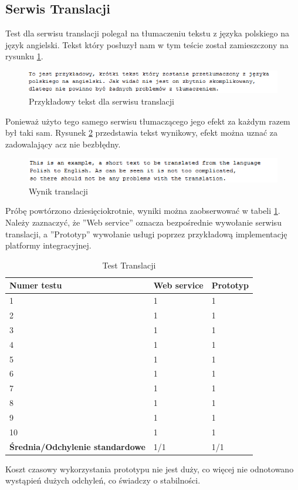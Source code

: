 \subsection{Serwis Translacji}
Test dla serwisu translacji polegał na tłumaczeniu tekstu z języka polskiego na język angielski. Tekst który posłuzył nam w tym teście został zamieszczony na rysunku \ref{fig:translatorExample}.
\begin{figure}[!h]
\centering
\includegraphics[scale=0.9]{translatorExample.png}
\caption{Przykładowy tekst dla serwisu translacji}\label{fig:translatorExample}
\end{figure}
Ponieważ użyto tego samego serwisu tłumaczącego jego efekt za każdym razem był taki sam. Rysunek \ref{fig:translatorResult} przedstawia tekst wynikowy, efekt można uznać za zadowalający acz nie bezbłędny. 
\begin{figure}[!h]
\centering
\includegraphics[scale=0.9]{translatorResult.png}
\caption{Wynik translacji}\label{fig:translatorResult}
\end{figure}

Próbę powtórzono dziesięciokrotnie, wyniki można zaobserwować w tabeli \ref{tab:translacja}. Należy zaznaczyć, że ''Web service'' oznacza bezpośrednie wywołanie serwisu translacji, a ''Prototyp'' wywołanie usługi poprzez przykładową implementację platformy integracyjnej.
\begin{center}
	\begin{table}[h]
	\label{tab:translacja}
	\caption{Test Translacji}
	\centering
	\begin{tabular}{| l | l | l |}	
		\hline
		\textbf{Numer testu} & \textbf{Web service} & \textbf{Prototyp} \\ \hline
		1 & 1 & 1\\ \hline
		2 & 1 & 1\\ \hline
		3 & 1 & 1\\ \hline
		4 & 1 & 1\\ \hline
		5 & 1 & 1\\ \hline
		6 & 1 & 1\\ \hline
		7 & 1 & 1\\ \hline
		8 & 1 & 1\\ \hline
		9 & 1 & 1\\ \hline
		10 & 1 & 1\\ \hline
		\textbf{Średnia/Odchylenie standardowe} & 1/1 & 1/1\\ 
		\hline
	\end{tabular}
	\end{table}
\end{center}
Koszt czasowy wykorzystania prototypu nie jest duży, co więcej nie odnotowano wystąpień dużych odchyleń, co świadczy o stabilności.

